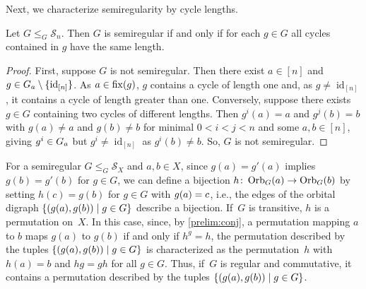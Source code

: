 Next, we characterize semiregularity by cycle lengths.

\begin{proposition}
 Let $G \le_G \mathcal S_n$. Then $G$
 is semiregular if and only if 
 for each $g \in G$
 all cycles contained in $g$ have the same length. %
\end{proposition} 
\begin{proof}
	First, suppose $G$ is not semiregular.
	Then there exist $a \in [n]$ and  $g \in \Stab{a}{G} \setminus \{ \operatorname{id}_{[n]}\}$.
	As $a \in \fix{g}$, $g$ contains a cycle of length one
	and, as $g \ne \operatorname{id}_{[n]}$,
	it contains a cycle of length greater than one.	 
	Conversely, suppose there exists $g \in G$ containing two cycles
	of different lengths.
	Then 
	$g^i(a) = a$ and $g^{j}(b) = b$ with $g(a) \ne a$ and $g(b) \ne b$
	for minimal $0 < i < j < n$
	and some $a,b \in [n]$, giving $g^i \in \Stab{a}{G}$ but $g^i \ne \operatorname{id}_{[n]}$
	as $g^i(b) \ne b$. So, $G$ is not semiregular.
\end{proof}

For a semiregular $G \le_G \mathcal S_X$ and $a,b \in X$, 
since  $g(a) = g'(a)$ implies $g(b) = g'(b)$
for $g \in G$,
we can define a bijection 
$h \colon \Orbit{a}{G} \to \Orbit{b}{G}$
by setting $h(c) = g(b)$ for $g \in G$ with $\applyfunc{a}{g} = c$, i.e.,
the edges of the orbital 
digraph $\{(\applyfunc{a}{g}, \applyfunc{b}{g}) \mid g \in G\}$  
describe a bijection.
If~$G$ is transitive, $h$ is a permutation on~$X$.
In this case, since, by \cref{prelim:conj},
a permutation mapping $a$ to $b$
maps $g(a)$ to $g(b)$ if and only if $h^g = h$,
the permutation described by the tuples $\{(\applyfunc{a}{g}, \applyfunc{b}{g}) \mid g \in G\}$ 
is characterized as the permutation~$h$
with $h(a) = b$ and $hg = gh$ for all $g \in G$.
Thus, if~$G$ is regular and commutative,
it contains a permutation described by
the tuples $\{(\applyfunc{a}{g}, \applyfunc{b}{g}) \mid g \in G\}$.

